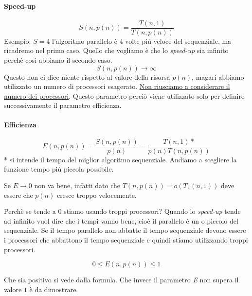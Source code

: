 \paragraph{Speed-up} 
$$S(n, p(n)) = \frac{T(n, 1)}{T(n, p(n))}$$
Esempio: $S=4$ l'algoritmo parallelo è $4$ volte più veloce del sequenziale, ma ricadremo nel primo caso. Quello che vogliamo è che lo \textit{speed-up} sia infinito perchè così abbiamo il secondo caso.
$$S(n,p(n)) \rightarrow \infty$$
Questo non ci dice niente rispetto al valore della risorsa $p(n)$, magari abbiamo utilizzato un numero di processori esagerato. \uline{Non riusciamo a considerare il numero dei processori}. Questo parametro perciò viene utilizzato solo per definire successivamente il parametro efficienza.

\paragraph{Efficienza}
$$E(n,p(n)) = \frac{S(n,p(n))}{p(n)} = \frac{T(n,1)*}{p(n)T(n,p(n))}$$
* si intende il tempo del miglior algoritmo sequenziale. Andiamo a scegliere la funzione tempo più piccola possibile.

Se $E \rightarrow 0$ non va bene, infatti dato che $T(n,p(n)) = o(T,(n,1))$ deve essere che $p(n)$ cresce troppo velocemente. 

Perchè se tende a $0$ stiamo usando troppi processori? Quando lo \textit{speed-up} tende ad infinito vuol dire che i tempi vanno bene, cioè il parallelo è un o piccolo del sequenziale. Se il tempo parallelo non abbatte il tempo sequenziale devono essere i processori che abbattono il tempo sequenziale e quindi stiamo utilizzando troppi processori.

$$0 \leq E(n, p(n)) \leq 1$$

Che sia positivo si vede dalla formula. Che invece il parametro \textit{E} non supera il valore $1$ è da dimostrare.

